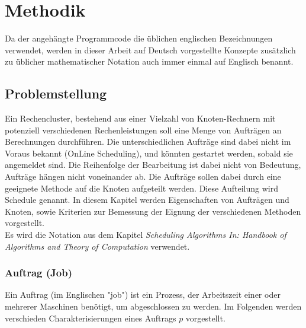 \chapter{Methodik}
\label{chap:methodik}
Da der angehängte Programmcode die üblichen englischen Bezeichnungen verwendet, werden in dieser Arbeit auf Deutsch vorgestellte Konzepte zusätzlich zu üblicher mathematischer Notation auch immer einmal auf Englisch benannt.

\section{Problemstellung}

Ein Rechencluster, bestehend aus einer Vielzahl von Knoten-Rechnern mit potenziell verschiedenen Rechenleistungen soll eine Menge von Aufträgen an Berechnungen durchführen. Die unterschiedlichen Aufträge sind dabei nicht im Voraus bekannt (OnLine Scheduling), und könnten gestartet werden, sobald sie angemeldet sind. Die Reihenfolge der Bearbeitung ist dabei nicht von Bedeutung, Aufträge hängen nicht voneinander ab. Die Aufträge sollen dabei durch eine geeignete Methode auf die Knoten aufgeteilt werden. Diese Aufteilung wird Schedule genannt. In diesem Kapitel werden Eigenschaften von Aufträgen und Knoten, sowie Kriterien zur Bemessung der Eignung der verschiedenen Methoden vorgestellt.\\
Es wird die Notation aus dem Kapitel \emph{Scheduling Algorithms In: Handbook of Algorithms and Theory of Computation} 
\cite{Kar97} verwendet.


\subsection{Auftrag (Job)}
Ein Auftrag (im Englischen "job") ist ein Prozess, der Arbeitszeit einer oder mehrerer Maschinen benötigt, um abgeschlossen zu werden. Im Folgenden werden verschieden Charakterisierungen eines Auftrags $p$ vorgestellt.

